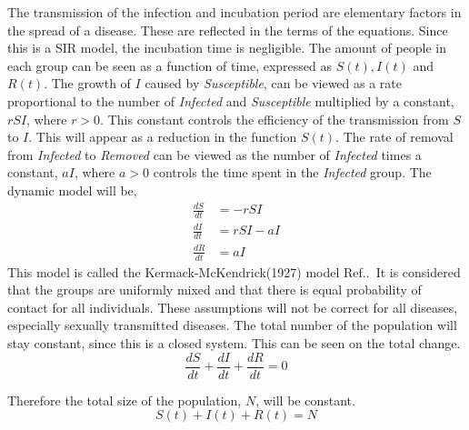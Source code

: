 \documentclass[%
twoside,                 %
final,                   %
chapterprefix=true,      %
open=right               %
10pt]{book}
\begin{document}
The transmission of the infection and incubation period are elementary factors in the spread of a disease. These are reflected in the terms of the equations. Since this is a SIR model, the incubation time is negligible. The amount of people in each group can be seen as a function of time, expressed as $S(t),I(t)$ and $R(t)$. The growth of $I$ caused by \emph{Susceptible}, can be viewed as a rate proportional to the number of \emph{Infected} and \emph{Susceptible} multiplied by a constant,$rSI$, where $r>0$. This constant controls the efficiency of the transmission from $S$ to $I$. This will appear as a reduction in the function $S(t)$. The rate of removal from \emph{Infected} to \emph{Removed} can be viewed as the number of \emph{Infected} times a constant, $aI$, where $a>0$ controls the time spent in the \emph{Infected} group. The dynamic model will be,
\begin{equation} \label{eq:SIR_model}
	\begin{aligned} 
	\frac{dS}{dt} &= -rSI \\ 
	\frac{dI}{dt} &= rSI-aI \\ 
	\frac{dR}{dt} &= aI 
	\end{aligned}
\end{equation}
This model is called the Kermack-McKendrick(1927) model Ref.\cite[p.~320]{murray2002mathematical}.~It is considered that the groups are uniformly mixed and that there is equal probability of contact for all individuals. These assumptions will not be correct for all diseases, especially sexually transmitted diseases. The total number of the population will stay constant, since this is a closed system. This can be seen on the total change.
\begin{equation}
\frac{dS}{dt} + \frac{dI}{dt} + \frac{dR}{dt} = 0
\end{equation}

Therefore the total size of the population, $N$, will be constant. 
\begin{equation} \label{eq:SIR_N}
S(t)+I(t)+R(t) = N
\end{equation}
\end{document}
